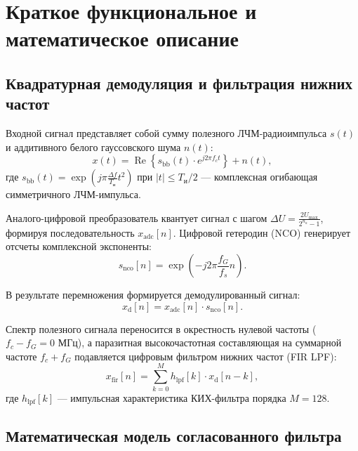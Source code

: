 \section{Краткое функциональное и математическое описание}

\subsection{Квадратурная демодуляция и фильтрация нижних частот}

Входной сигнал представляет собой сумму полезного ЛЧМ-радиоимпульса $s(t)$ и аддитивного белого гауссовского шума $n(t)$:
\begin{equation}
    x(t) = \operatorname{Re}\left\{ s_{\text{bb}}(t) \cdot e^{j 2\pi f_c t} \right\} + n(t),
\end{equation}
где $s_{\text{bb}}(t) = \exp\left(j \pi \frac{\Delta f}{T_{\text{и}}} t^2\right)$ при $|t| \le T_{\text{и}}/2$ --- комплексная огибающая симметричного ЛЧМ-импульса.

Аналого-цифровой преобразователь квантует сигнал с шагом $\Delta U = \frac{2 U_{\max}}{2^{n_a} - 1}$, формируя последовательность $x_{\text{adc}}[n]$. Цифровой гетеродин (NCO) генерирует отсчеты комплексной экспоненты:
\begin{equation}
    s_{\text{nco}}[n] = \exp\left(-j 2\pi \frac{f_G}{f_s} n\right).
\end{equation}

В результате перемножения формируется демодулированный сигнал:
\begin{equation}
    x_{\text{d}}[n] = x_{\text{adc}}[n] \cdot s_{\text{nco}}[n].
\end{equation}

Спектр полезного сигнала переносится в окрестность нулевой частоты ($f_c - f_G = 0$ МГц), а паразитная высокочастотная составляющая на суммарной частоте $f_c + f_G$ подавляется цифровым фильтром нижних частот (FIR LPF):
\begin{equation}
    x_{\text{fir}}[n] = \sum_{k=0}^{M} h_{\text{lpf}}[k] \cdot x_{\text{d}}[n-k],
\end{equation}
где $h_{\text{lpf}}[k]$ --- импульсная характеристика КИХ-фильтра порядка $M=128$.

\subsection{Математическая модель согласованного фильтра}

